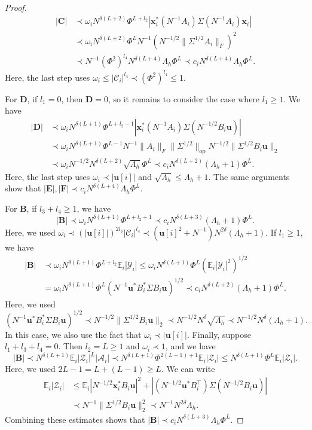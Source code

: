 \documentclass[10pt,a4paper]{amsart}
\def\E{\mathbb{E}}
\def\cA{\mathcal{A}}
\def\cC{\mathcal{C}}
\def\cY{\mathcal{Y}}
\def\cZ{\mathcal{Z}}
\def\op{\mathrm{op}}
\def\u{\mathbf{u}}
\def\x{\mathbf{x}}
\begin{document}
\begin{proof}
\begin{align*}
    |\mathbf{C}|&\prec\omega_iN^{\delta(L+2)}\Phi^{L+l_2}|\x_i^*(N^{-1}A_i)\Sigma(N^{-1}A_i)\x_i|\\
    &\prec \omega_iN^{\delta(L+2)}\Phi^{L}N^{-1}(N^{-1/2}\|\Sigma^{1/2}A_i\|_F)^2\\
    &\prec N^{-1}(\Phi^2)^{l_4}N^{\delta(L+4)}\Lambda_h\Phi^L\prec c_iN^{\delta(L+4)}\Lambda_h\Phi^L.
\end{align*}
Here, the last step uses $\omega_i\leq |\cC_i|^{l_4}\prec (\Phi^2)^{l_4}\leq 1$.

For $\mathbf{D}$, if $l_1=0$, then $\mathbf{D}=0$, so it remains to consider the case where $l_1\geq 1$. We have
\begin{align*}
    |\mathbf{D}|&\prec\omega_iN^{\delta(L+1)}\Phi^{L+l_2-1}|\x_i^*(N^{-1}A_i)\Sigma(N^{-1/2}B_i\u)|\\
    &\prec\omega_iN^{\delta(L+1)}\Phi^{L-1}N^{-1}\|A_i\|_F\|\Sigma^{1/2}\|_\op N^{-1/2}\|\Sigma^{1/2}B_i\u\|_2\\
    &\prec\omega_iN^{-1/2}N^{\delta(L+2)}\sqrt{\Lambda_h}\Phi^{L}\prec c_iN^{\delta(L+2)}(\Lambda_h+1)\Phi^{L}.
\end{align*}
Here, the last step uses $\omega_i\prec|\u[i]|$ and $\sqrt{\Lambda_h}\leq\Lambda_h+1$. The same arguments show that $|\mathbf{E}|,|\mathbf{F}|\prec c_iN^{\delta(L+4)}\Lambda_h\Phi^L$.

For $\mathbf{B}$, if $l_3+l_4\geq 1$, we have
\[
    |\mathbf{B}|\prec\omega_iN^{\delta(L+1)}\Phi^{L+l_2+1}\prec c_iN^{\delta(L+3)}(\Lambda_h+1)\Phi^L.
\]
Here, we used $\omega_i\prec(|\u[i]|)^{2l_3}|\cC_i|^{l_4}\prec(\u[i]^2+N^{-1})N^{2\delta}(\Lambda_h+1)$. If $l_1\geq 1$, we have
\begin{align*}
    |\mathbf{B}|&\prec\omega_iN^{\delta(L+1)}\Phi^{L+l_2}\E_i|\cY_i|\leq \omega_iN^{\delta(L+1)}\Phi^{L}(\E_i|\cY_i|^2)^{1/2}\\
    &=\omega_iN^{\delta(L+1)}\Phi^{L}(N^{-1}\u^*B_i^*\Sigma B_i\u)^{1/2}\prec c_iN^{\delta(L+2)}(\Lambda_h+1)\Phi^L.
\end{align*}
Here, we used
\[
    (N^{-1}\u^*B_i^*\Sigma B_i\u)^{1/2}\prec N^{-1/2}\|\Sigma^{1/2}B_i\u\|_2\prec N^{-1/2}N^\delta\sqrt{\Lambda_h}\prec N^{-1/2}N^\delta(\Lambda_h+1).
\]
In this case, we also use the fact that $\omega_i\prec|\u[i]|$. Finally, suppose $l_1+l_3+l_4=0$. Then $l_2=L\geq 1$ and $\omega_i\prec 1$, and we have
\[
    |\mathbf{B}|\prec N^{\delta(L+1)}\E_i|\cZ_i|^L|\cA_i|\prec N^{\delta(L+1)}\Phi^{2(L-1)+1}\E_i|\cZ_i|\leq N^{\delta(L+1)}\Phi^L\E_i|\cZ_i|.
\]
Here, we used $2L-1=L+(L-1)\geq L$. We can write
\begin{align*}
    \E_i|\cZ_i|&\leq\E_i|N^{-1/2}\x_i^*B_i\u|^2+|(N^{-1/2}\u^*B_i^\top)\Sigma(N^{-1/2}B_i\u)|\\
    &\prec N^{-1}\|\Sigma^{1/2}B_i\u\|_2^2\prec N^{-1}N^{2\delta}\Lambda_h.
\end{align*}
Combining these estimates shows that $|\mathbf{B}|\prec c_iN^{\delta(L+3)}\Lambda_h\Phi^L$.


\end{proof}
\end{document}
